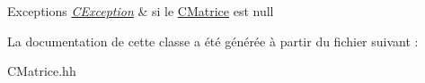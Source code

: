 \begin{DoxyExceptions}{Exceptions}
{\em \hyperlink{classCException}{C\+Exception}} & si le \hyperlink{classCMatrice}{C\+Matrice} est null \\
\hline
\end{DoxyExceptions}


La documentation de cette classe a été générée à partir du fichier suivant \+:\begin{DoxyCompactItemize}
\item 
C\+Matrice.\+hh\end{DoxyCompactItemize}
